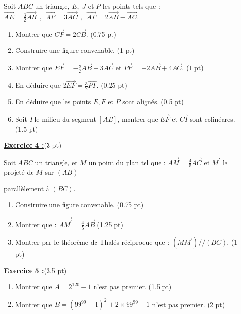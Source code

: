 \documentclass[12pt,a4paper]{article}
\begin{document}
Soit $ABC$ un triangle, $E,$ $J$ et $P$ les points tels que : $\overrightarrow{AE} = \displaystyle\frac{3}{2}\overrightarrow{AB}\ \ ;\ \ \overrightarrow{AF} = 3\overrightarrow{AC}\ \ ;\ \  \overrightarrow{AP} = 2\overrightarrow{AB} - \overrightarrow{AC}$.
\begin{enumerate}
    \item Montrer que $\overrightarrow{CP} = 2\overrightarrow{CB}$. (0.75 pt)
    \item Construire une figure convenable. (1 pt)
    \item Montrer que $\overrightarrow{EF} = -\displaystyle\frac{3}{2}\overrightarrow{AB} + 3\overrightarrow{AC}$ et $\overrightarrow{PF} = -2\overrightarrow{AB} + 4\overrightarrow{AC}$. (1 pt)
    \item En déduire que  $2\overrightarrow{EF} = \displaystyle\frac{3}{2}\overrightarrow{PF}$. (0.25 pt)
    \item En déduire que les points $E, F$ et $P$ sont alignés. (0.5 pt)
    \item Soit $I$ le milieu du segment $[AB]$, montrer que $\overrightarrow{EF}$ et $\overrightarrow{CI}$ sont colinéares. (1.5 pt)
\end{enumerate}

\underline{\large\textbf{Exercice 4 :}}(3 pt)

Soit $ABC$ un triangle, et $M$ un point du plan tel que : $\overrightarrow{AM} = \displaystyle\frac{4}{5}\overrightarrow{AC}$ et $M^{'}$ le projeté de $M$ sur $(AB)$ 

parallèlement à $(BC)$.
\begin{enumerate}
    \item Construire une figure convenable. (0.75 pt)
    \item Montrer que : $\overrightarrow{AM^{'}} = \displaystyle\frac{4}{5}\overrightarrow{AB}$ (1.25 pt)
    \item Montrer par le théorème de Thalés réciproque que : $(MM^{'}) // (BC)$. (1 pt)
\end{enumerate}



\underline{\large\textbf{Exercice 5 :}}(3.5 pt)
\begin{enumerate}
    \item Montrer que $A = 2^{120} - 1$ n'est pas premier. (1.5 pt)
    \item Montrer que $B = (99^{99} - 1)^2 + 2\times 99^{99} - 1$ n'est pas premier. (2 pt)
\end{enumerate}
\end{document}
